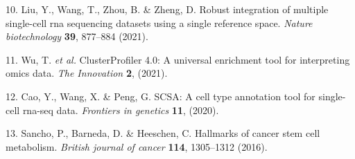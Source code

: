 \documentclass[
]{article}
\newenvironment{cslreferences}%
  {}%
  {\par}
\begin{document}
\begin{cslreferences}
\leavevmode\hypertarget{ref-RobustIntegratLiuY2021}{}%
10. Liu, Y., Wang, T., Zhou, B. \& Zheng, D. Robust integration of multiple single-cell rna sequencing datasets using a single reference space. \emph{Nature biotechnology} \textbf{39}, 877--884 (2021).

\leavevmode\hypertarget{ref-ClusterprofilerWuTi2021}{}%
11. Wu, T. \emph{et al.} ClusterProfiler 4.0: A universal enrichment tool for interpreting omics data. \emph{The Innovation} \textbf{2}, (2021).

\leavevmode\hypertarget{ref-ScsaACellTyCaoY2020}{}%
12. Cao, Y., Wang, X. \& Peng, G. SCSA: A cell type annotation tool for single-cell rna-seq data. \emph{Frontiers in genetics} \textbf{11}, (2020).

\leavevmode\hypertarget{ref-HallmarksOfCaSancho2016}{}%
13. Sancho, P., Barneda, D. \& Heeschen, C. Hallmarks of cancer stem cell metabolism. \emph{British journal of cancer} \textbf{114}, 1305--1312 (2016).
\end{cslreferences}
\end{document}
